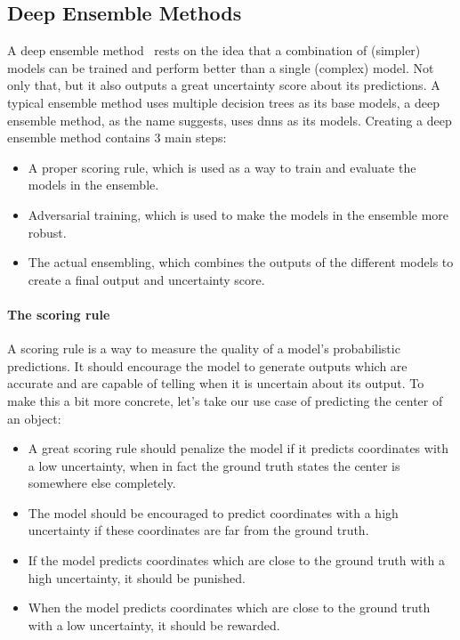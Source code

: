 \subsection{Deep Ensemble Methods} \label{ch:literature-study_section:uncertainty-aware-ai-models_subsection:deep-ensemble-methods}
A deep ensemble method~\cite{src:deep-ensemble-methods} rests on the idea that a combination of (simpler) models can be trained and perform better than a single (complex) model.
Not only that, but it also outputs a great uncertainty score about its predictions.
A typical ensemble method uses multiple decision trees as its base models, a deep ensemble method, as the name suggests, uses \glspl{dnn} as its models.
Creating a deep ensemble method contains 3 main steps:
\begin{itemize}
    \item A proper scoring rule, which is used as a way to train and evaluate the models in the ensemble.
    \item Adversarial training, which is used to make the models in the ensemble more robust.
    \item The actual ensembling, which combines the outputs of the different models to create a final output and uncertainty score.
\end{itemize}

\paragraph{The scoring rule}
A scoring rule is a way to measure the quality of a model's probabilistic predictions.
It should encourage the model to generate outputs which are accurate and are capable of telling when it is uncertain about its output.
To make this a bit more concrete, let's take our use case of predicting the center of an object:
\begin{itemize}
    \item A great scoring rule should penalize the model if it predicts coordinates with a low uncertainty, when in fact the ground truth states the center is somewhere else completely.
    \item The model should be encouraged to predict coordinates with a high uncertainty if these coordinates are far from the ground truth.
    \item If the model predicts coordinates which are close to the ground truth with a high uncertainty, it should be punished.
    \item When the model predicts coordinates which are close to the ground truth with a low uncertainty, it should be rewarded.
\end{itemize}

